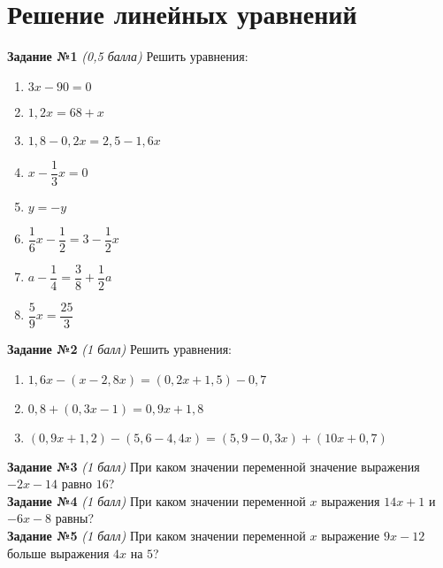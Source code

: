 \documentclass[12pt, a4paper]{article}
\begin{document}
		

\section*{Решение линейных уравнений}
\textbf{Задание №1} \textit{(0,5 балла)} Решить уравнения:
\begin{multicols}{3}
	\begin{enumerate}[label=\asbuk*)]
		\item $3x-90=0$
		\item $1,2x=68+x$
		\item $1,8-0,2x=2,5-1,6x$
		\item $x-\dfrac{1}{3}x=0$
		\item $y=-y$
		\item $\dfrac{1}{6}x-\dfrac{1}{2}=3-\dfrac{1}{2}x$
		\item $a-\dfrac{1}{4}=\dfrac{3}{8}+\dfrac{1}{2}a$
		\item $\dfrac{5}{9}x=\dfrac{25}{3}$
	\end{enumerate}
\end{multicols}

\textbf{Задание №2} \textit{(1 балл)} Решить уравнения:
\begin{enumerate}[label=\asbuk*)]
	\item $1,6x-(x-2,8x)=(0,2x+1,5)-0,7$
	\item $0,8+(0,3x-1)=0,9x+1,8$
	\item $(0,9x+1,2)-(5,6-4,4x)=(5,9-0,3x)+(10x+0,7)$
\end{enumerate}

\textbf{Задание №3} \textit{(1 балл)} При каком значении переменной значение выражения $-2x-14$ равно $16$?\\

\textbf{Задание №4} \textit{(1 балл)} При каком значении переменной $x$ выражения $14x+1$ и $-6x-8$ равны?\\

\textbf{Задание №5} \textit{(1 балл)} При каком значении переменной $x$ выражение $9x-12$ больше выражения $4x$ на $5$?
\end{document}

